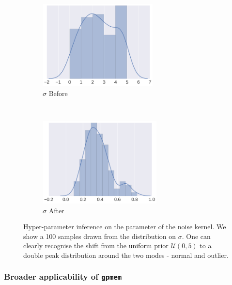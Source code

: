 \documentclass{article} %
\newcommand{\gpmem}{\texttt{gpmem}}
\begin{document}
\begin{figure}
        \centering
        \begin{subfigure}[b]{0.5\textwidth} \centering
                \includegraphics[height=4.5cm]{figs/neal_unif_sigma_before_desktop_50_5.png}
                \caption{$\sigma$ Before}
                \label{fig:before}
        \end{subfigure}%
        ~ %
        \begin{subfigure}[b]{0.5\textwidth} \centering
                \includegraphics[height=4.5cm]{figs/neal_unif_sigma_after_ulliDesktop_n503.png}
                \caption{$\sigma$  After}
                \label{fig:after))}
        \end{subfigure}
        \caption{Hyper-parameter inference on the parameter of the noise kernel. We show a 100 samples drawn from the distribution on $\sigma$. One can clearly recognise the shift from the uniform prior $\mathcal{U}(0,5)$ to a double peak distribution around the two modes - normal and outlier.}\label{fig:inference}
\end{figure}

\subsubsection{Broader applicability of \gpmem}
\end{document}
